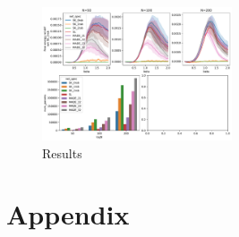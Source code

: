 \documentclass[aps,physrev,10pt,floatfix,reprint]{revtex4-2}
\begin{document}
\begin{figure}[]
    \centering 
    \includegraphics[width=0.5\textwidth]{img/SK_res.pdf}
    \caption{Results}
    \label{fig:SK}
\end{figure}



%

\section{Appendix}
%

\end{document}
